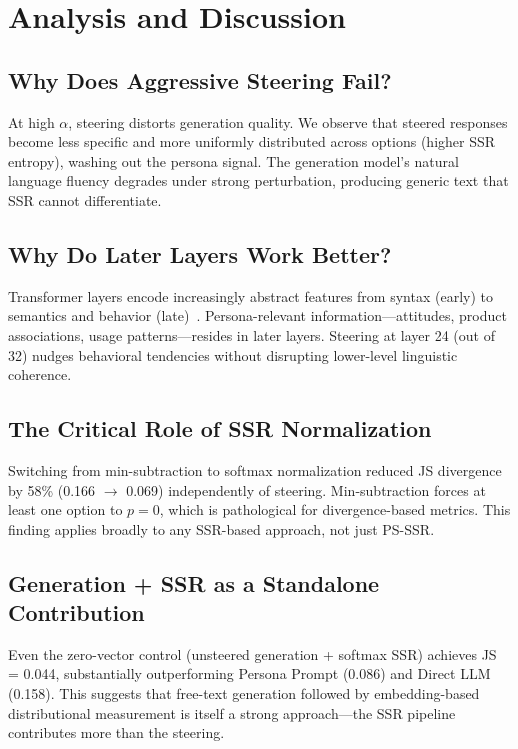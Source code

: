 \documentclass[letterpaper]{article}
\newcommand{\method}{PS-SSR}
\begin{document}
\section{Analysis and Discussion}
\label{sec:discussion}

\subsection{Why Does Aggressive Steering Fail?}

At high $\alpha$, steering distorts generation quality. We observe that steered responses become less specific and more uniformly distributed across options (higher SSR entropy), washing out the persona signal. The generation model's natural language fluency degrades under strong perturbation, producing generic text that SSR cannot differentiate.

\subsection{Why Do Later Layers Work Better?}

Transformer layers encode increasingly abstract features from syntax (early) to semantics and behavior (late)~\citep{zou2023representation}. Persona-relevant information---attitudes, product associations, usage patterns---resides in later layers. Steering at layer 24 (out of 32) nudges behavioral tendencies without disrupting lower-level linguistic coherence.

\subsection{The Critical Role of SSR Normalization}

Switching from min-subtraction to softmax normalization reduced JS divergence by 58\% (0.166 $\to$ 0.069) independently of steering. Min-subtraction forces at least one option to $p = 0$, which is pathological for divergence-based metrics. This finding applies broadly to any SSR-based approach, not just \method{}.

\subsection{Generation + SSR as a Standalone Contribution}

Even the zero-vector control (unsteered generation + softmax SSR) achieves JS = 0.044, substantially outperforming Persona Prompt (0.086) and Direct LLM (0.158). This suggests that free-text generation followed by embedding-based distributional measurement is itself a strong approach---the SSR pipeline contributes more than the steering.
\end{document}
